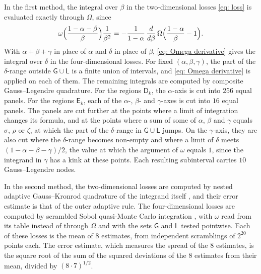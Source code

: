 \documentclass{article}
\numberwithin{equation}{section}
\begin{document}
In the first method, the integral over $\beta$ in the two-dimensional losses \eqref{eq: loss} is evaluated exactly through $\Omega$, since
\begin{equation}
\label{eq: Omega derivative}
\omega\Bigl( \frac{1 - \alpha - \beta}{\beta} \Bigr) \frac{1}{\beta^2} = -\frac{1}{1 - \alpha}\, \frac{d}{d\beta}\, \Omega\Bigl( \frac{1 - \alpha}{\beta} - 1 \Bigr).
\end{equation}
With $\alpha + \beta + \gamma$ in place of $\alpha$ and $\delta$ in place of $\beta$, \eqref{eq: Omega derivative} gives the integral over $\delta$ in the four-dimensional losses. For fixed $(\alpha, \beta, \gamma)$, the part of the $\delta$-range outside $\mathsf{G} \cup \mathsf{L}$ is a finite union of intervals, and \eqref{eq: Omega derivative} is applied on each of them. The remaining integrals are computed by composite Gauss--Legendre quadrature. For the regions $\mathsf{D}_k$, the $\alpha$-axis is cut into $256$ equal panels. For the regions $\mathsf{E}_k$, each of the $\alpha$-, $\beta$- and $\gamma$-axes is cut into $16$ equal panels. The panels are cut further at the points where a limit of integration changes its formula, and at the points where a sum of some of $\alpha$, $\beta$ and $\gamma$ equals $\sigma$, $\rho$ or $\zeta$, at which the part of the $\delta$-range in $\mathsf{G} \cup \mathsf{L}$ jumps. On the $\gamma$-axis, they are also cut where the $\delta$-range becomes non-empty and where a limit of $\delta$ meets $(1 - \alpha - \beta - \gamma)/2$, the value at which the argument of $\omega$ equals $1$, since the integrand in $\gamma$ has a kink at these points. Each resulting subinterval carries $10$ Gauss--Legendre nodes.

In the second method, the two-dimensional losses are computed by nested adaptive Gauss--Kronrod quadrature of the integrand itself \citep{piessens1983quadpack}, and their error estimate is that of the outer adaptive rule. The four-dimensional losses are computed by scrambled Sobol quasi-Monte Carlo integration \citep{sobol1967distribution, matousek1998l2}, with $\omega$ read from its table instead of through $\Omega$ and with the sets $\mathsf{G}$ and $\mathsf{L}$ tested pointwise. Each of these losses is the mean of $8$ estimates, from independent scramblings of $2^{20}$ points each. The error estimate, which measures the spread of the $8$ estimates, is the square root of the sum of the squared deviations of the $8$ estimates from their mean, divided by $(8 \cdot 7)^{1/2}$.
\end{document}
